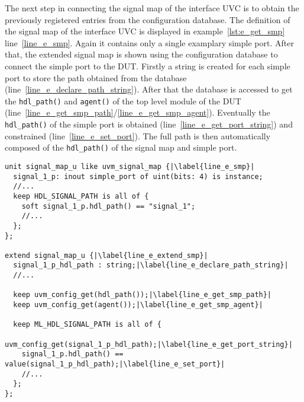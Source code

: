 The next step in connecting the signal map of the interface UVC is to obtain the previously registered entries from the configuration database. The definition of the signal map of the interface UVC is displayed in example~\ref{lst:e_get_smp} line~\ref{line_e_smp}. Again it contains only a single examplary simple port. After that, the extended signal map is shown using the configuration database to connect the simple port to the DUT. Firstly a string is created for each simple port to store the path obtained from the database (line~\ref{line_e_declare_path_string}). After that the database is accessed to get the \lstinline$hdl_path()$ and \lstinline$agent()$ of the top level module of the DUT (line~\ref{line_e_get_smp_path}/\ref{line_e_get_smp_agent}). Eventually the \lstinline$hdl_path()$ of the simple port is obtained (line~\ref{line_e_get_port_string}) and constrained (line~\ref{line_e_set_port}). The full path is then automatically composed of the \lstinline$hdl_path()$ of the signal map and simple port.
\lstset{language=e, numbers = left, escapechar=|, breaklines=true}
\begin{lstlisting}[frame=htrbl, caption={\textit{e}: getting the simple port configuration of the UVM-\textit{e} signal map},
label={lst:e_get_smp}]
unit signal_map_u like uvm_signal_map {|\label{line_e_smp}|
  signal_1_p: inout simple_port of uint(bits: 4) is instance;
  //...
  keep HDL_SIGNAL_PATH is all of {
    soft signal_1_p.hdl_path() == "signal_1";
    //...
  };
};

extend signal_map_u {|\label{line_e_extend_smp}|
  signal_1_p_hdl_path : string;|\label{line_e_declare_path_string}|
  //...

  keep uvm_config_get(hdl_path());|\label{line_e_get_smp_path}|
  keep uvm_config_get(agent());|\label{line_e_get_smp_agent}|

  keep ML_HDL_SIGNAL_PATH is all of {
    uvm_config_get(signal_1_p_hdl_path);|\label{line_e_get_port_string}|
    signal_1_p.hdl_path() == value(signal_1_p_hdl_path);|\label{line_e_set_port}|
    //...
  };
}; 
\end{lstlisting}